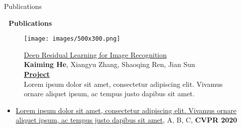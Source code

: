 \begin{section}{Publications}
\label{sec:publications}

\begin{center}
\huge{\textbf{📝 Publications}}
\end{center}

\begin{figure}
  \begin{minipage}{0.3\textwidth}
    \centering
    \texttt{[image: images/500x300.png]}
  \end{minipage}
  \begin{minipage}{0.7\textwidth}
    \href{https://openaccess.thecvf.com/content_cvpr_2016/papers/He_Deep_Residual_Learning_CVPR_2016_paper.pdf}{Deep Residual Learning for Image Recognition}\\
    \textbf{Kaiming He}, Xiangyu Zhang, Shaoqing Ren, Jian Sun\\
    \href{https://scholar.google.com/citations?view_op=view_citation&hl=zh-CN&user=DhtAFkwAAAAJ&citation_for_view=DhtAFkwAAAAJ:ALROH1vI_8AC}{\textbf{Project}}\\
    Lorem ipsum dolor sit amet, consectetur adipiscing elit. Vivamus ornare aliquet ipsum, ac tempus justo dapibus sit amet.
  \end{minipage}
\end{figure}

\begin{itemize}
  \item \href{https://github.com}{Lorem ipsum dolor sit amet, consectetur adipiscing elit. Vivamus ornare aliquet ipsum, ac tempus justo dapibus sit amet}, A, B, C, \textbf{CVPR 2020}
\end{itemize}
\end{section} 